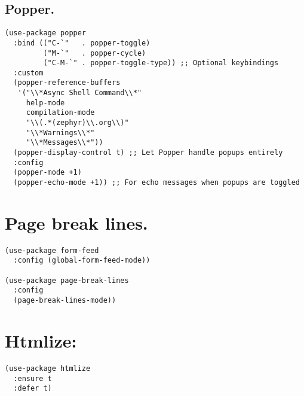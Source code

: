 \documentclass[11pt]{article}
\begin{document}
\subsection{Popper.}
\label{sec:orgef32642}
\begin{verbatim}
(use-package popper
  :bind (("C-`"   . popper-toggle)
         ("M-`"   . popper-cycle)
         ("C-M-`" . popper-toggle-type)) ;; Optional keybindings
  :custom
  (popper-reference-buffers
   '("\\*Async Shell Command\\*"
     help-mode
     compilation-mode
     "\\(.*(zephyr)\\.org\\)"
     "\\*Warnings\\*"
     "\\*Messages\\*"))
  (popper-display-control t) ;; Let Popper handle popups entirely
  :config
  (popper-mode +1)
  (popper-echo-mode +1)) ;; For echo messages when popups are toggled
\end{verbatim}
\section{Page break lines.}
\label{sec:org6fd59b2}
\begin{verbatim}
(use-package form-feed
  :config (global-form-feed-mode))

(use-package page-break-lines
  :config
  (page-break-lines-mode))
\end{verbatim}
\section{Htmlize:}
\label{sec:org66b31d9}
\begin{verbatim}
(use-package htmlize
  :ensure t
  :defer t)
\end{verbatim}
\end{document}
